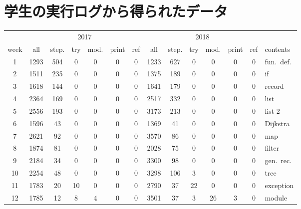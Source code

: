 \chapter{学生の実行ログから得られたデータ}
\begin{table}[!b]
\begin{center}
  \begin{tabular}{|c||c|c|c|c|c|c||c|c|c|c|c|c||l|}
    \hline
    & \multicolumn{6}{|c||}{2017} & \multicolumn{6}{|c||}{2018} & \\ \cline{2-13}
    \hspace{-1mm}week\hspace{-1mm} & all & step. & try & \hspace{-1mm}mod.\hspace{-1mm} & \hspace{-1mm}print\hspace{-1mm} & ref
    & all & step. & try & \hspace{-1mm}mod.\hspace{-1mm} & \hspace{-1mm}print\hspace{-1mm} & ref & contents\\ \hline
    1 & 1293 & 504 & 0 & 0 & 0 & 0 & 1233 & 627 & 0 & 0 & 0 & 0 & fun.\ def.\\ \hline
    2 & 1511 & 235 & 0 & 0 & 0 & 0 & 1375 & 189 & 0 & 0 & 0 & 0 & if\\ \hline
    3 & 1618 & 144 & 0 & 0 & 0 & 0 & 1641 & 179 & 0 & 0 & 0 & 0 & record\\ \hline
    4 & 2364 & 169 & 0 & 0 & 0 & 0 & 2517 & 332 & 0 & 0 & 0 & 0 & list\\ \hline
    5 & 2556 & 193 & 0 & 0 & 0 & 0 & 3173 & 213 & 0 & 0 & 0 & 0 & list 2\\ \hline
    6 & 1596 & 43 & 0 & 0 & 0 & 0 & 1369 & 41 & 0 & 0 & 0 & 0 & Dijkstra\\ \hline
    7 & 2621 & 92 & 0 & 0 & 0 & 0 & 3570 & 86 & 0 & 0 & 0 & 0 & map\\ \hline
    8 & 1874 & 81 & 0 & 0 & 0 & 0 & 2028 & 75 & 0 & 0 & 0 & 0 & filter\\ \hline
    9 & 2184 & 34 & 0 & 0 & 0 & 0 & 3300 & 98 & 0 & 0 & 0 & 0 & gen.\ rec.\\ \hline
    10 & 2254 & 48 & 0 & 0 & 0 & 0 & 3298 & 106 & 3 & 0 & 0 & 0 & tree\\ \hline
    11 & 1783 & 20 & 10 & 0 & 0 & 0 & 2790 & 37 & 22 & 0 & 0 & 0 & exception\\ \hline
    12 & 1785 & 12 & 8 & 4 & 0 & 0 & 3501 & 37 & 3 & 26 & 3 & 0 & module\\ \hline

\end{tabular}
\end{center}
\end{table}

